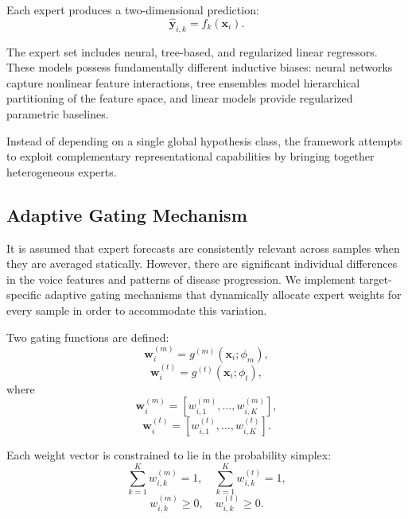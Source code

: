 \documentclass{customIEEEsingle}
\begin{document}
	Each expert produces a two-dimensional prediction:
	\begin{equation}
		\hat{\mathbf{y}}_{i,k} = f_k(\mathbf{x}_i).
	\end{equation}
	
	The expert set includes neural, tree-based, and regularized linear regressors. 
	These models possess fundamentally different inductive biases: neural networks capture nonlinear feature interactions, tree ensembles model hierarchical partitioning of the feature space, and linear models provide regularized parametric baselines. 
	
	Instead of depending on a single global hypothesis class, the framework attempts to exploit complementary representational capabilities by bringing together heterogeneous experts.
	
	\subsection{Adaptive Gating Mechanism}
	
	It is assumed that expert forecasts are consistently relevant across samples when they are averaged statically. However, there are significant individual differences in the voice features and patterns of disease progression. We implement target-specific adaptive gating mechanisms that dynamically allocate expert weights for every sample in order to accommodate this variation.
	
	Two gating functions are defined:
	\begin{equation}
		\mathbf{w}_i^{(m)} = g^{(m)}(\mathbf{x}_i; \phi_m),
	\end{equation}
	\begin{equation}
		\mathbf{w}_i^{(t)} = g^{(t)}(\mathbf{x}_i; \phi_t),
	\end{equation}
	where
	\begin{equation}
		\mathbf{w}_i^{(m)} = [w_{i,1}^{(m)}, \dots, w_{i,K}^{(m)}],
	\end{equation}
	\begin{equation}
		\mathbf{w}_i^{(t)} = [w_{i,1}^{(t)}, \dots, w_{i,K}^{(t)}].
	\end{equation}
	
	Each weight vector is constrained to lie in the probability simplex:
	\begin{equation}
		\sum_{k=1}^{K} w_{i,k}^{(m)} = 1, \quad 
		\sum_{k=1}^{K} w_{i,k}^{(t)} = 1,
	\end{equation}
	\begin{equation}
		w_{i,k}^{(m)} \ge 0, \quad w_{i,k}^{(t)} \ge 0.
	\end{equation}
	
\end{document}

